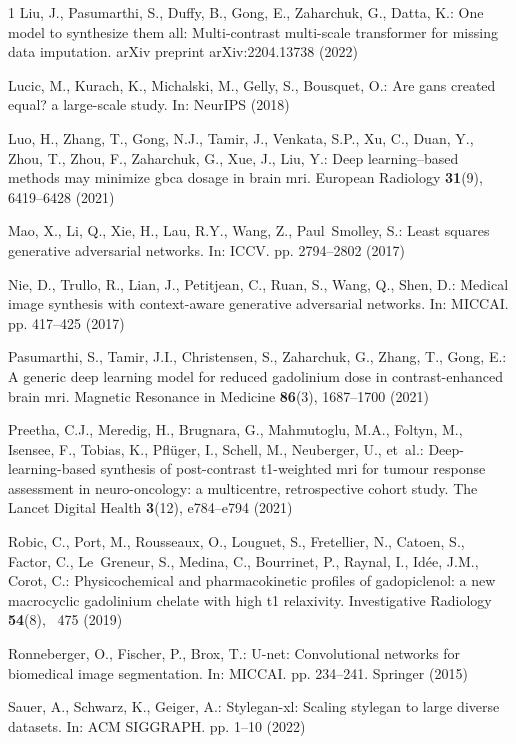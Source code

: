 \documentclass[a4paper,10pt]{article}
\begin{document}
\begin{thebibliography}{1}
Liu, J., Pasumarthi, S., Duffy, B., Gong, E., Zaharchuk, G., Datta, K.: One
  model to synthesize them all: Multi-contrast multi-scale transformer for
  missing data imputation. arXiv preprint arXiv:2204.13738  (2022)

Lucic, M., Kurach, K., Michalski, M., Gelly, S., Bousquet, O.: Are gans created
  equal? a large-scale study. In: NeurIPS (2018)

Luo, H., Zhang, T., Gong, N.J., Tamir, J., Venkata, S.P., Xu, C., Duan, Y.,
  Zhou, T., Zhou, F., Zaharchuk, G., Xue, J., Liu, Y.: Deep learning--based
  methods may minimize gbca dosage in brain mri. European Radiology
  \textbf{31}(9),  6419--6428 (2021)

Mao, X., Li, Q., Xie, H., Lau, R.Y., Wang, Z., Paul~Smolley, S.: Least squares
  generative adversarial networks. In: ICCV. pp. 2794--2802 (2017)

Nie, D., Trullo, R., Lian, J., Petitjean, C., Ruan, S., Wang, Q., Shen, D.:
  Medical image synthesis with context-aware generative adversarial networks.
  In: MICCAI. pp. 417--425 (2017)

Pasumarthi, S., Tamir, J.I., Christensen, S., Zaharchuk, G., Zhang, T., Gong,
  E.: A generic deep learning model for reduced gadolinium dose in
  contrast-enhanced brain mri. Magnetic Resonance in Medicine  \textbf{86}(3),
  1687--1700 (2021)

Preetha, C.J., Meredig, H., Brugnara, G., Mahmutoglu, M.A., Foltyn, M.,
  Isensee, F., Tobias, K., Pfl{\"u}ger, I., Schell, M., Neuberger, U., et~al.:
  Deep-learning-based synthesis of post-contrast t1-weighted mri for tumour
  response assessment in neuro-oncology: a multicentre, retrospective cohort
  study. The Lancet Digital Health  \textbf{3}(12),  e784--e794 (2021)

Robic, C., Port, M., Rousseaux, O., Louguet, S., Fretellier, N., Catoen, S.,
  Factor, C., Le~Greneur, S., Medina, C., Bourrinet, P., Raynal, I., Id{\'e}e,
  J.M., Corot, C.: Physicochemical and pharmacokinetic profiles of
  gadopiclenol: a new macrocyclic gadolinium chelate with high t1 relaxivity.
  Investigative Radiology  \textbf{54}(8), ~475 (2019)

Ronneberger, O., Fischer, P., Brox, T.: U-net: Convolutional networks for
  biomedical image segmentation. In: MICCAI. pp. 234--241. Springer (2015)

Sauer, A., Schwarz, K., Geiger, A.: Stylegan-xl: Scaling stylegan to large
  diverse datasets. In: ACM SIGGRAPH. pp. 1--10 (2022)


\end{thebibliography}
\end{document}
